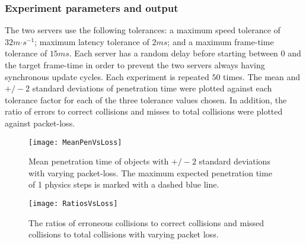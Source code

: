 \subsubsection{Experiment parameters and output}
The two servers use the following tolerances: a maximum speed tolerance of $32m\mathord{\cdot}s^{-1}$; maximum latency tolerance of $2ms$; and a maximum frame-time tolerance of $15ms$. Each server has a random delay before starting between $0$ and the target frame-time in order to prevent the two servers always having synchronous update cycles. Each experiment is repeated $50$ times. The mean and $+/-2$ standard deviations of penetration time were plotted against each tolerance factor for each of the three tolerance values chosen. In addition, the ratio of errors to correct collisions and misses to total collisions were plotted against packet-loss.

\begin{figure}[t]
	\texttt{[image: MeanPenVsLoss]}
	\caption{Mean penetration time of objects with $+/-2$ standard deviations with varying packet-loss. The maximum expected penetration time of 1 physics steps is marked with a dashed blue line.}
	\label{fig_CollisionsPenVsLoss}
\end{figure}
\begin{figure}[t]
	\centering
	\texttt{[image: RatiosVsLoss]}
	\caption{The ratios of erroneous collisions to correct collisions and missed collisions to total collisions with varying packet loss.} %
	\label{fig_RatiosVsLoss}
\end{figure}

